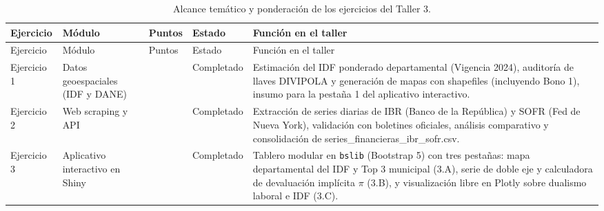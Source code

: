 \documentclass[
  10pt,
  letterpaper,
  DIV=11,
  numbers=noendperiod]{scrartcl}
\begin{document}
\begin{longtable}[]{@{}
  >{\raggedright\arraybackslash}p{}
  >{\raggedright\arraybackslash}p{}
  >{\centering\arraybackslash}p{}
  >{\centering\arraybackslash}p{}
  >{\raggedright\arraybackslash}p{}@{}}
\caption{Alcance temático y ponderación de los ejercicios del Taller
3.}\label{tbl-alcance-ejercicios}\tabularnewline
\toprule\noalign{}
\begin{minipage}[b]{\linewidth}\raggedright
Ejercicio
\end{minipage} & \begin{minipage}[b]{\linewidth}\raggedright
Módulo
\end{minipage} & \begin{minipage}[b]{\linewidth}\centering
Puntos
\end{minipage} & \begin{minipage}[b]{\linewidth}\centering
Estado
\end{minipage} & \begin{minipage}[b]{\linewidth}\raggedright
Función en el taller
\end{minipage} \\
\midrule\noalign{}
\endfirsthead
\toprule\noalign{}
\begin{minipage}[b]{\linewidth}\raggedright
Ejercicio
\end{minipage} & \begin{minipage}[b]{\linewidth}\raggedright
Módulo
\end{minipage} & \begin{minipage}[b]{\linewidth}\centering
Puntos
\end{minipage} & \begin{minipage}[b]{\linewidth}\centering
Estado
\end{minipage} & \begin{minipage}[b]{\linewidth}\raggedright
Función en el taller
\end{minipage} \\
\midrule\noalign{}
\endhead
\bottomrule\noalign{}
\endlastfoot
Ejercicio 1 & Datos geoespaciales (IDF y DANE) & 1.5 & Completado &
Estimación del IDF ponderado departamental (Vigencia 2024), auditoría de
llaves DIVIPOLA y generación de mapas con shapefiles (incluyendo Bono
1), insumo para la pestaña 1 del aplicativo interactivo. \\
Ejercicio 2 & Web scraping y API & 2.0 & Completado & Extracción de
series diarias de IBR (Banco de la República) y SOFR (Fed de Nueva
York), validación con boletines oficiales, análisis comparativo y
consolidación de series\_financieras\_ibr\_sofr.csv. \\
Ejercicio 3 & Aplicativo interactivo en Shiny & 1.5 & Completado &
Tablero modular en \texttt{bslib} (Bootstrap 5) con tres pestañas: mapa
departamental del IDF y Top 3 municipal (3.A), serie de doble eje y
calculadora de devaluación implícita \(\pi\) (3.B), y visualización
libre en Plotly sobre dualismo laboral e IDF (3.C). \\
\end{longtable}
\end{document}
